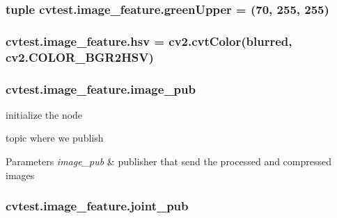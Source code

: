 \subsubsection[{\texorpdfstring{green\+Upper}{greenUpper}}]{\setlength{\rightskip}{0pt plus 5cm}tuple cvtest.\+image\+\_\+feature.\+green\+Upper = (70, 255, 255)\hspace{0.3cm}{\ttfamily [static]}}\hypertarget{classcvtest_1_1image__feature_a1e044a4137c5a99ee987abf14da300c8}{}\label{classcvtest_1_1image__feature_a1e044a4137c5a99ee987abf14da300c8}
\subsubsection[{\texorpdfstring{hsv}{hsv}}]{\setlength{\rightskip}{0pt plus 5cm}cvtest.\+image\+\_\+feature.\+hsv = cv2.\+cvt\+Color({\bf blurred}, cv2.\+C\+O\+L\+O\+R\+\_\+\+B\+G\+R2\+H\+SV)\hspace{0.3cm}{\ttfamily [static]}}\hypertarget{classcvtest_1_1image__feature_ab2a73c5df818816ebbb06235e4bab1a9}{}\label{classcvtest_1_1image__feature_ab2a73c5df818816ebbb06235e4bab1a9}
\subsubsection[{\texorpdfstring{image\+\_\+pub}{image_pub}}]{\setlength{\rightskip}{0pt plus 5cm}cvtest.\+image\+\_\+feature.\+image\+\_\+pub}\hypertarget{classcvtest_1_1image__feature_a534a9df53a4263a7a4b28e0033b520d6}{}\label{classcvtest_1_1image__feature_a534a9df53a4263a7a4b28e0033b520d6}


initialize the node 

topic where we publish 
\begin{DoxyParams}{Parameters}
{\em image\+\_\+pub} & publisher that send the processed and compressed images \\
\hline
\end{DoxyParams}
\subsubsection[{\texorpdfstring{joint\+\_\+pub}{joint_pub}}]{\setlength{\rightskip}{0pt plus 5cm}cvtest.\+image\+\_\+feature.\+joint\+\_\+pub}\hypertarget{classcvtest_1_1image__feature_a6099e7721ccd9571b2d1f94962479e21}{}\label{classcvtest_1_1image__feature_a6099e7721ccd9571b2d1f94962479e21}

